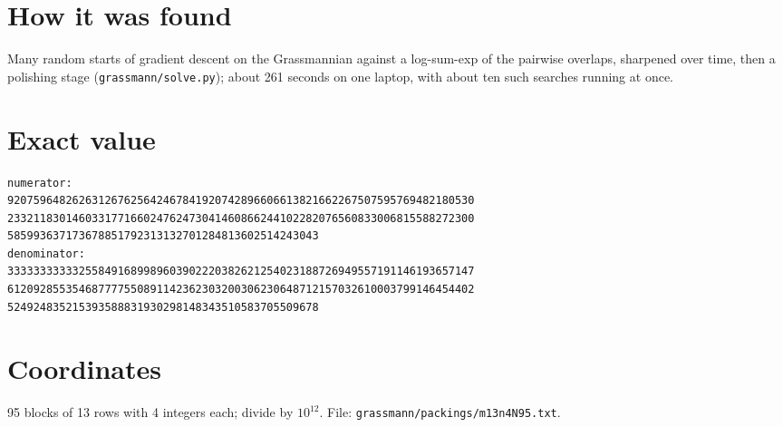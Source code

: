 \documentclass[11pt,a4paper]{article}
\begin{document}
\section{How it was found}
Many random starts of gradient descent on the Grassmannian against a log-sum-exp of the pairwise overlaps, sharpened over time, then a polishing stage (\texttt{grassmann/solve.py}); about 261 seconds on one laptop, with about ten such searches running at once.


\appendix
\section{Exact value}
{\small
\begin{verbatim}
numerator:
920759648262631267625642467841920742896606613821662267507595769482180530
233211830146033177166024762473041460866244102282076560833006815588272300
585993637173678851792313132701284813602514243043
denominator:
333333333332558491689989603902220382621254023188726949557191146193657147
612092855354687777550891142362303200306230648712157032610003799146454402
524924835215393588831930298148343510583705509678
\end{verbatim}}

\section{Coordinates}
95 blocks of 13 rows with 4 integers each; divide by $10^{12}$. File: \texttt{grassmann/packings/m13n4N95.txt}.
{\tiny
\begin{multicols}{3}
\end{multicols}}
\end{document}
